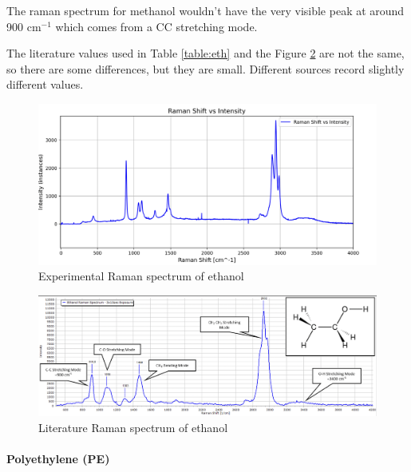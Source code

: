     \bigskip
    
    The raman spectrum for methanol wouldn't have the very visible peak at around 900 cm\(^{-1}\) which comes from a CC stretching mode.

    The literature values used in Table \ref{table:eth} and the Figure \ref{fig:eth_l} are not the same, so there are some differences, but they are small. Different sources record slightly different values. 

    

    \newpage

    \begin{figure}[h]
        \includegraphics[width=\textwidth]{images/raman_spectra/raman_shift_ethanol.png}
        \caption{Experimental Raman spectrum of ethanol}
        \label{fig:eth_x}
        \vspace{30pt}
    \end{figure}


    \begin{figure}[h]
        \centering
        \includegraphics[width=\textwidth]{images/lit_raman/ethanol.png}
        \caption{Literature Raman spectrum of ethanol \cite{spectrumet} }
        \label{fig:eth_l}
    \end{figure}

    \newpage

    \paragraph{Polyethylene (PE)}

